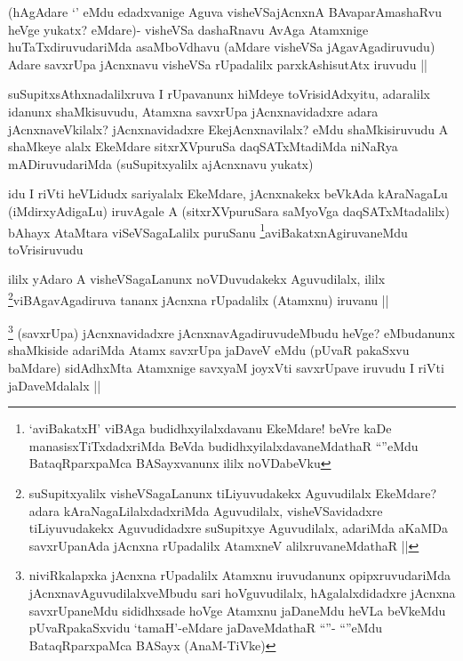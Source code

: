 \begin{artha}
(hAgAdare `\stext' eMdu edadxvanige Aguva visheVSajAcnxnA BAvaparAmashaRvu heVge yukatx? eMdare)- visheVSa dashaRnavu AvAga Atamxnige huTaTxdiruvudariMda asaMboVdhavu (aMdare visheVSa jAgavAgadiruvudu) Adare savxrUpa jAcnxnavu visheVSa rUpadalilx parxkAshisutAtx iruvudu ||
\end{artha}

\begin{artha}
suSupitxsAthxnadalilxruva I rUpavanunx hiMdeye toVrisidAdxyitu, adaralilx idanunx shaMkisuvudu, Atamxna savxrUpa jAcnxnavidadxre adara jAcnxnaveVkilalx? jAcnxnavidadxre EkejAcnxnavilalx? eMdu shaMkisiruvudu A shaMkeye alalx EkeMdare sitxrXVpuruSa daqSATxMtadiMda niNaRya mADiruvudariMda (suSupitxyalilx ajAcnxnavu yukatx)
\end{artha}


\begin{artha}
idu I riVti heVLidudx sariyalalx EkeMdare, jAcnxnakekx beVkAda kAraNagaLu (iMdirxyAdigaLu) iruvAgale A (sitxrXVpuruSara saMyoVga daqSATxMtadalilx) bAhayx AtaMtara viSeVSagaLalilx puruSanu \footnote{`aviBakatxH' viBAga budidhxyilalxdavanu EkeMdare! beVre kaDe manasisxTiTxdadxriMda BeVda budidhxyilalxdavaneMdathaR ``\stext''eMdu BataqRparxpaMca BASayxvanunx ililx noVDabeVku}aviBakatxnAgiruvaneMdu toVrisiruvudu
\end{artha}

\begin{artha}
ililx yAdaro A visheVSagaLanunx noVDuvudakekx Aguvudilalx, ililx \footnote{suSupitxyalilx visheVSagaLanunx tiLiyuvudakekx Aguvudilalx EkeMdare? adara kAraNagaLilalxdadxriMda Aguvudilalx, visheVSavidadxre tiLiyuvudakekx Aguvudidadxre suSupitxye Aguvudilalx, adariMda aKaMDa savxrUpanAda jAcnxna rUpadalilx AtamxneV alilxruvaneMdathaR ||}viBAgavAgadiruva tananx jAcnxna rUpadalilx (Atamxnu) iruvanu ||
\end{artha}


\begin{artha}
\footnote{niviRkalapxka jAcnxna rUpadalilx Atamxnu iruvudanunx opipxruvudariMda jAcnxnavAguvudilalxveMbudu sari hoVguvudilalx, hAgalalxdidadxre jAcnxna savxrUpaneMdu sididhxsade hoVge Atamxnu jaDaneMdu heVLa beVkeMdu pUvaRpakaSxvidu `tamaH'-eMdare jaDaveMdathaR ``\stext''- ``\stext''eMdu BataqRparxpaMca BASayx (AnaM-TiVke)}
(savxrUpa) jAcnxnavidadxre jAcnxnavAgadiruvudeMbudu heVge? eMbudanunx shaMkiside adariMda Atamx savxrUpa jaDaveV eMdu (pUvaR pakaSxvu baMdare) sidAdhxMta Atamxnige savxyaM joyxVti savxrUpave iruvudu I riVti jaDaveMdalalx ||
\end{artha}

